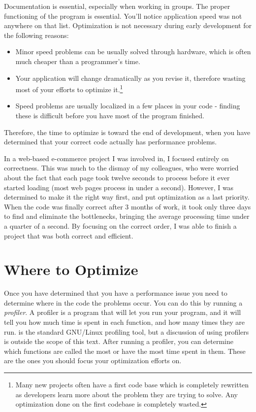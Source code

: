 Documentation is essential, especially when working in groups.  The proper
functioning of the program is essential.  
You'll notice application speed was not anywhere on that list.  Optimization is
not necessary during early development for the following reasons:

\begin{itemize}\item Minor speed problems can be usually solved through hardware, which is often much cheaper than a programmer's time. 
\item Your application will change dramatically as you revise it, therefore wasting most of your efforts to optimize it.\footnote{Many
new projects often have a first code base which is completely rewritten
as developers learn more about the problem they are trying to solve.  Any
optimization done on the first codebase is completely wasted.} 
\item Speed problems are usually localized in a few places in your code - finding these is difficult before you have most of the program finished. 
\end{itemize}

Therefore, the time to optimize is toward the end of development, when you
have determined that your correct code actually has performance problems. 

In a web-based e-commerce project I was involved in, I focused entirely on 
correctness.  This was much to the dismay of my colleagues, who were worried
about the fact that each page took twelve seconds to process before it ever
started loading (most web pages process in under a second).  However, I
was determined to make it the right way first, and put optimization as a 
last priority.  When the code was finally correct after 3 months of work,
it took only three days to find and eliminate the bottlenecks, bringing
the average processing time under a quarter of a second.  By focusing on the
correct order, I was able to finish a project that was both correct and
efficient.

\section{Where to Optimize}
\label{wheretooptimize}

Once you have determined that you have a performance issue you need
to determine where in the code the problems occur.  You can do this
by running a 
\emph{profiler}.
A profiler is a program that will let you run your program, and it
will tell you how much time is spent in each function, and how many
times they are run.   is the standard GNU/Linux
profiling tool, but a discussion of using profilers is outside 
the scope of this text.  After running a profiler, you can determine which
functions are called the most or have the most time spent in them.  These
are the ones you should focus your optimization efforts on.

